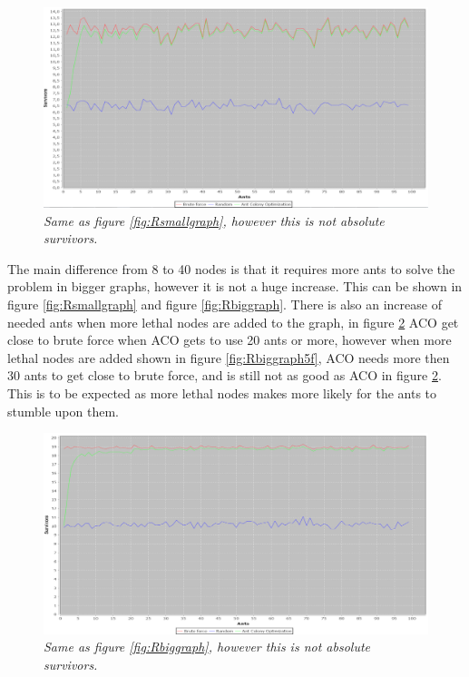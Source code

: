 \begin{figure} %
\hspace*{-1.5 cm}
\includegraphics[width=160mm]{images/Float8Nodes2Leathal1Exitpng.png}
\caption{\textit{Same as figure \ref{fig:Rsmallgraph}, however this is not absolute survivors.}}
\label{fig:Rsmallgraphf}
\end{figure}

The main difference from 8 to 40 nodes is that it requires more ants to solve the problem in bigger graphs, however it is not a huge increase. This can be shown in figure \ref{fig:Rsmallgraph} and figure \ref{fig:Rbiggraph}. There is also an increase of needed ants when more lethal nodes are added to the graph, in figure \ref{fig:Rbiggraph2f} ACO get close to brute force when ACO gets to use 20 ants or more, however when more lethal nodes are added shown in figure \ref{fig:Rbiggraph5f}, ACO needs more then 30 ants to get close to brute force, and is still not as good as ACO in figure \ref{fig:Rbiggraph2f}. This is to be expected as more lethal nodes makes more likely for the ants to stumble upon them.

\begin{figure} %
\hspace*{-1.5 cm}
\includegraphics[width=160mm]{images/Float40Nodes2Leathal2Exit.png}
\caption{\textit{Same as figure \ref{fig:Rbiggraph}, however this is not absolute survivors.}}
\label{fig:Rbiggraph2f}
\end{figure}



